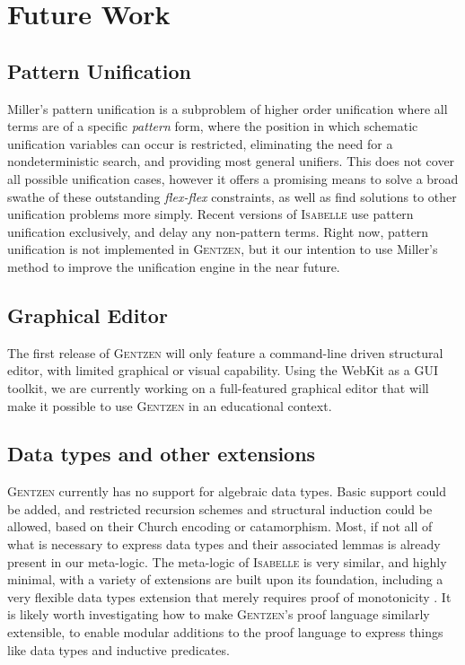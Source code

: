 \documentclass[a4paper]{jfp}
\begin{document}
\section{Future Work}

\subsection{Pattern Unification}

Miller's pattern unification \cite{Miller90alogic} is a subproblem of higher order unification where
all terms are of a specific \emph{pattern} form, where the position in which schematic unification
variables can occur is restricted, eliminating the need for a nondeterministic search, and providing
most general unifiers. This does not cover all possible unification cases,
however it offers a promising means to solve a broad
swathe of these outstanding \emph{flex-flex} constraints, as well as find solutions to other
unification problems more simply. Recent versions of \textsc{Isabelle} use pattern unification 
exclusively, and delay any non-pattern terms. Right now, pattern unification is not implemented
in \textsc{Gentzen}, but it our intention to use Miller's method to improve the unification engine
in the near future.

\subsection{Graphical Editor}

The first release of \textsc{Gentzen} will only feature a command-line driven structural editor,
with limited graphical or visual capability. Using the WebKit as a GUI toolkit, we are currently 
working on a full-featured graphical editor that will make it possible to use \textsc{Gentzen} in
an educational context.

\subsection{Data types and other extensions}

\textsc{Gentzen} currently has no support for algebraic data types. Basic support could be added, and
restricted recursion schemes and structural induction could be allowed,
based on their Church encoding or catamorphism. Most, if not all of what is necessary to express data
types and their associated lemmas is already present in our meta-logic. The meta-logic of 
\textsc{Isabelle} is very similar, and highly minimal, with a variety of extensions are built upon 
its foundation, including a very flexible data types extension that merely requires proof
of monotonicity \cite{Paulson:vr}. It is likely worth investigating how to make \textsc{Gentzen}'s proof language similarly  extensible, to enable modular additions to the proof language to express things like data types
and inductive predicates.
\end{document}
